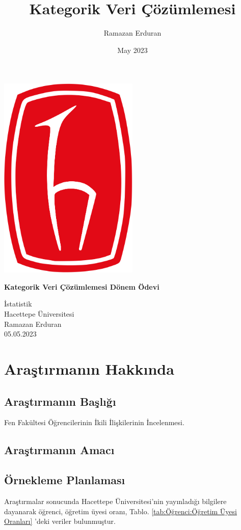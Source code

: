\documentclass{article}
\title{Kategorik Veri Çözümlemesi}
\author{Ramazan Erduran}
\date{May 2023}
\begin{document}
\begin{titlepage}
    \begin{center}
        \includegraphics[width=0.5\textwidth]{hacettepe_logo.png}
        
        \vspace*{1cm}
        \Huge
        \textbf{Kategorik Veri Çözümlemesi Dönem Ödevi}

        \vfill
        
        \Large
        İstatistik \\
        Hacettepe Üniversitesi \\
        Ramazan Erduran \\
        05.05.2023
        
    \end{center}
\end{titlepage}

\newpage

\section{Araştırmanın Hakkında}
\subsection{Araştırmanın Başlığı}
Fen Fakültesi Öğrencilerinin İkili İlişkilerinin İncelenmesi.

\subsection{Araştırmanın Amacı}

\subsection{Örnekleme Planlaması}
Araştırmalar sonucunda Hacettepe Üniversitesi'nin yayınladığı bilgilere dayanarak öğrenci, öğretim üyesi oranı, Tablo. \ref{tab:Öğrenci:Öğretim Üyesi Oranları} 'deki veriler bulunmuştur.
\end{document}
